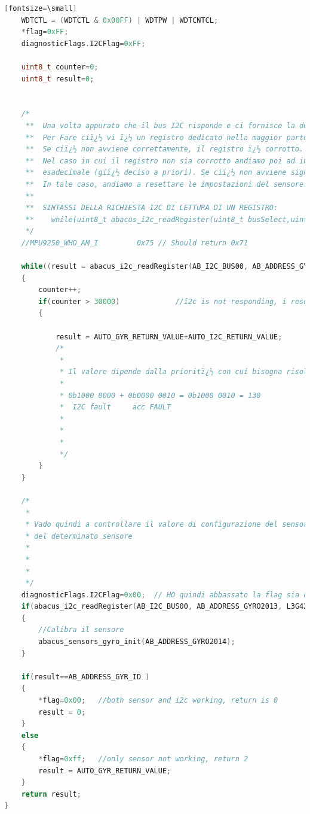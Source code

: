 \documentclass[LaM,binding=0.6cm]{../sapthesis}
\begin{document}
\begin{lstlisting}[language=c][fontsize=\small]
    WDTCTL = (WDTCTL & 0x00FF) | WDTPW | WDTCNTCL;
    *flag=0xFF;
    diagnosticFlags.I2CFlag=0xFF;

    uint8_t counter=0;
    uint8_t result=0;


    /*
     **  Una volta appurato che il bus I2C risponde e ci fornisce la determinata risorsa, bisogna valutare che i registri non siano corrotti.
     **  Per Fare ciï¿½ vi ï¿½ un registro dedicato nella maggior parte dei sensori chiamato "Device ID" che ci permette di leggere il nome del sensore.
     **  Se ciï¿½ non avviene correttamente, il registro ï¿½ corrotto.
     **  Nel caso in cui il registro non sia corrotto andiamo poi ad indagare il registro di configurazione, il quale deve essere impostato secondo un determinato valore
     **  esadecimale (giï¿½ deciso a priori). Se ciï¿½ non avviene significa che qualcosa ï¿½ cambiato e ciï¿½ ï¿½ inaspettato.
     **  In tale caso, andiamo a resettare le impostazioni del sensore.
     **
     **  SINTASSI DELLA RICHIESTA I2C DI LETTURA DI UN REGISTRO:
     **    while(uint8_t abacus_i2c_readRegister(uint8_t busSelect,uint8_t address, uint8_t reg)
     */
    //MPU9250_WHO_AM_I         0x75 // Should return 0x71

    while((result = abacus_i2c_readRegister(AB_I2C_BUS00, AB_ADDRESS_GYRO2014, L3G4200_DEVID))==0x00)
    {
        counter++;
        if(counter > 30000)             //i2c is not responding, i reset, so i set both acc and i2c not working to be sure
        {

            result = AUTO_GYR_RETURN_VALUE+AUTO_I2C_RETURN_VALUE;
            /*
             *
             * Il valore dipende dalla prioritï¿½ con cui bisogna risolvere il problema: questo identifica che sia il bus IC che l'accelerometro sono non funzionanti:
             *
             * 0b1000 0000 + 0b0000 0010 = 0b1000 0010 = 130
             *  I2C fault     acc FAULT
             *
             *
             *
             */
        }
    }

    /*
     *
     * Vado quindi a controllare il valore di configurazione del sensore, se ciï¿½ non va bene, richiamo la funzione di calibrazione
     * del determinato sensore
     *
     *
     *
     */
    diagnosticFlags.I2CFlag=0x00;  // HO quindi abbassato la flag sia del sensore che del bus
    if(abacus_i2c_readRegister(AB_I2C_BUS00, AB_ADDRESS_GYRO2013, L3G4200CONFIGREG)!=L3G4200_STD_CONFIG)
    {
        //Calibra il sensore
        abacus_sensors_gyro_init(AB_ADDRESS_GYRO2014);
    }

    if(result==AB_ADDRESS_GYR_ID )
    {
        *flag=0x00;   //both sensor and i2c working, return is 0
        result = 0;
    }
    else
    {
        *flag=0xff;   //only sensor not working, return 2
        result = AUTO_GYR_RETURN_VALUE;
    }
    return result;
}



\end{lstlisting}
\end{document}
